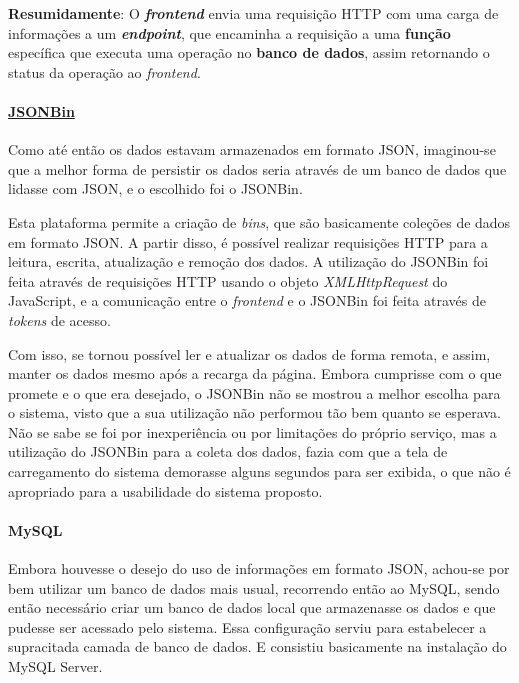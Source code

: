 \textbf{Resumidamente}: O \textbf{\textit{frontend}} envia uma requisição HTTP com uma carga de informações a um \textbf{\textit{endpoint}}, que encaminha a requisição a uma \textbf{função} específica que executa uma operação no \textbf{banco de dados}, assim retornando o status da operação ao \textit{frontend}.

\paragraph*{\href{https://jsonbin.io/}{JSONBin}}

Como até então os dados estavam armazenados em formato JSON, imaginou-se que a melhor forma de persistir os dados seria através de um banco de dados que lidasse com JSON, e o escolhido foi o JSONBin.

Esta plataforma permite a criação de \textit{bins}, que são basicamente coleções de dados em formato JSON. A partir disso, é possível realizar requisições HTTP para a leitura, escrita, atualização e remoção dos dados. A utilização do JSONBin foi feita através de requisições HTTP usando o objeto \textit{XMLHttpRequest} do JavaScript, e a comunicação entre o \textit{frontend} e o JSONBin foi feita através de \textit{tokens} de acesso.

Com isso, se tornou possível ler e atualizar os dados de forma remota, e assim, manter os dados mesmo após a recarga da página. Embora cumprisse com o que promete e o que era desejado, o JSONBin não se mostrou a melhor escolha para o sistema, visto que a sua utilização não performou tão bem quanto se esperava. Não se sabe se foi por inexperiência ou por limitações do próprio serviço, mas a utilização do JSONBin para a coleta dos dados, fazia com que a tela de carregamento do sistema demorasse alguns segundos para ser exibida, o que não é apropriado para a usabilidade do sistema proposto.

\paragraph*{MySQL}

Embora houvesse o desejo do uso de informações em formato JSON, achou-se por bem utilizar um banco de dados mais usual, recorrendo então ao MySQL, sendo então necessário criar um banco de dados local que armazenasse os dados e que pudesse ser acessado pelo sistema. Essa configuração serviu para estabelecer a supracitada camada de banco de dados. E consistiu basicamente na instalação do MySQL Server.

